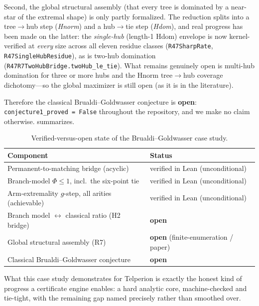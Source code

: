Second, the global structural assembly (that every tree is dominated by a
near-star of the extremal shape) is only partly formalized. The reduction splits
into a tree$\to$hub step (\emph{Hnorm}) and a hub$\to$tie step (\emph{Hdom}), and
real progress has been made on the latter: the \emph{single-hub} (length-1 Hdom)
envelope is now kernel-verified at \emph{every} size across all eleven residue
classes (\texttt{R47SharpRate}, \texttt{R47SingleHubResidue}), as is two-hub
domination (\texttt{R47R7TwoHubBridge.twoHub\_le\_tie}). What remains genuinely
open is multi-hub domination for three or more hubs and the Hnorm tree$\to$hub
coverage dichotomy---so the global maximizer is still open (as it is in the
literature).

Therefore the classical Brualdi--Goldwasser conjecture is \textbf{open}:
\texttt{conjecture1\_proved = False} throughout the repository, and we make no
claim otherwise.  summarizes.

\begin{table}[t]
  \centering
  \begin{tabular}{@{}ll@{}}
    \toprule
    Component & Status \\
    \midrule
    Permanent-to-matching bridge (acyclic) & verified in Lean (unconditional) \\
    Branch-model $\Phi \le 1$, incl.\ the six-point tie & verified in Lean
      (unconditional) \\
    Arm-extremality $g$-step, all arities (achievable) & verified in Lean
      (unconditional) \\
    Branch model $\leftrightarrow$ classical ratio (H2 bridge) & \textbf{open} \\
    Global structural assembly (R7) & \textbf{open} (finite-enumeration / paper) \\
    Classical Brualdi--Goldwasser conjecture & \textbf{open} \\
    \bottomrule
  \end{tabular}
  \caption{Verified-versus-open state of the Brualdi--Goldwasser case study.}
  \label{tab:bg-status}
\end{table}

What this case study demonstrates for Telperion is exactly the honest kind of
progress a certificate engine enables: a hard analytic core, machine-checked and
tie-tight, with the remaining gap named precisely rather than smoothed over.
